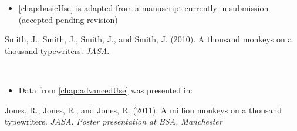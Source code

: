 \raggedleft

\begin{itemize}
\item \cref{chap:basicUse} is adapted from a manuscript currently in submission (accepted pending revision)
\end{itemize}
\parbox{.85\textwidth}{\parindent -0.2in \small
Smith, J., Smith, J., Smith, J., and Smith, J. (2010). A thousand monkeys on a thousand typewriters. \textit{JASA}.
\newline}\\[18pt]

\begin{itemize}
\item Data from \cref{chap:advancedUse} was presented in:
\end{itemize}
\parbox{.85\textwidth}{\parindent -0.2in \small
Jones, R., Jones, R., and Jones, R. (2011). A million monkeys on a thousand typewriters. \textit{JASA}. \textit{Poster presentation at BSA, Manchester}
\newline}\\